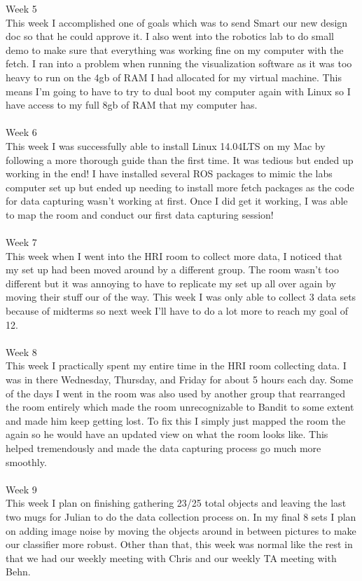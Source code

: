 \documentclass[draftclsnofoot, onecolumn, 10pt, compsoc]{IEEEtran}
\begin{document}
  Week 5 \\
\indent This week I accomplished one of goals which was to send Smart our new design doc so that he could approve it. I also went into the robotics lab to do small demo to make sure that everything was working fine on my computer with the fetch. I ran into a problem when running the visualization software as it was too heavy to run on the 4gb of RAM I had allocated for my virtual machine. This means I'm going to have to try to dual boot my computer again with Linux so I have access to my full 8gb of RAM that my computer has.\\\\
  Week 6 \\
\indent This week I was successfully able to install Linux 14.04LTS on my Mac by following a more thorough guide than the first time. It was tedious but ended up working in the end! I have installed several ROS packages to mimic the labs computer set up but ended up needing to install more fetch packages as the code for data capturing wasn't working at first. Once I did get it working, I was able to map the room and conduct our first data capturing session! \\\\
  Week 7 \\
\indent This week when I went into the HRI room to collect more data, I noticed that my set up had been moved around by a different group. The room wasn't too different but it was annoying to have to replicate my set up all over again by moving their stuff our of the way. This week I was only able to collect 3 data sets because of midterms so next week I'll have to do a lot more to reach my goal of 12. \\\\
  Week 8 \\
\indent This week I practically spent my entire time in the HRI room collecting data. I was in there Wednesday, Thursday, and Friday for about 5 hours each day. Some of the days I went in the room was also used by another group that rearranged the room entirely which made the room unrecognizable to Bandit to some extent and made him keep getting lost. To fix this I simply just mapped the room the again so he would have an updated view on what the room looks like. This helped tremendously and made the data capturing process go much more smoothly. \\\\
  Week 9 \\
\indent This week I plan on finishing gathering 23/25 total objects and leaving the last two mugs for Julian to do the data collection process on. In my final 8 sets I plan on adding image noise by moving the objects around in between pictures to make our classifier more robust. Other than that, this week was normal like the rest in that we had our weekly meeting with Chris and our weekly TA meeting with Behn. \\\\
\end{document}

